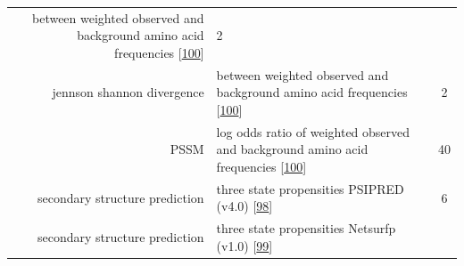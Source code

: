 \documentclass[12pt,a4paper,twoside]{book}
\theoremstyle{definition}
\theoremstyle{definition}
\theoremstyle{remark}
\begin{document}
\begin{longtable}[]{@{}rlc@{}}
\begin{minipage}[t]{0.50\columnwidth}
between weighted observed and background amino acid frequencies
{[}\protect\hyperlink{ref-Robinson1991}{100}{]}\strut
\end{minipage} & \begin{minipage}[t]{0.18\columnwidth}\centering\strut
2\strut
\end{minipage}\tabularnewline
\begin{minipage}[t]{0.23\columnwidth}\raggedleft\strut
jennson shannon divergence\strut
\end{minipage} & \begin{minipage}[t]{0.50\columnwidth}\raggedright\strut
between weighted observed and background amino acid frequencies
{[}\protect\hyperlink{ref-Robinson1991}{100}{]}\strut
\end{minipage} & \begin{minipage}[t]{0.18\columnwidth}\centering\strut
2\strut
\end{minipage}\tabularnewline
\begin{minipage}[t]{0.23\columnwidth}\raggedleft\strut
PSSM\strut
\end{minipage} & \begin{minipage}[t]{0.50\columnwidth}\raggedright\strut
log odds ratio of weighted observed and background amino acid
frequencies {[}\protect\hyperlink{ref-Robinson1991}{100}{]}\strut
\end{minipage} & \begin{minipage}[t]{0.18\columnwidth}\centering\strut
40\strut
\end{minipage}\tabularnewline
\begin{minipage}[t]{0.23\columnwidth}\raggedleft\strut
secondary structure prediction\strut
\end{minipage} & \begin{minipage}[t]{0.50\columnwidth}\raggedright\strut
three state propensities PSIPRED (v4.0)
{[}\protect\hyperlink{ref-Jones1999}{98}{]}\strut
\end{minipage} & \begin{minipage}[t]{0.18\columnwidth}\centering\strut
6\strut
\end{minipage}\tabularnewline
\begin{minipage}[t]{0.23\columnwidth}\raggedleft\strut
secondary structure prediction\strut
\end{minipage} & \begin{minipage}[t]{0.50\columnwidth}\raggedright\strut
three state propensities Netsurfp (v1.0)
{[}\protect\hyperlink{ref-Petersen2009a}{99}{]}\strut
\end{minipage} & \begin{minipage}[t]{0.18\columnwidth}\centering\strut

\end{minipage}
\end{longtable}
\end{document}

